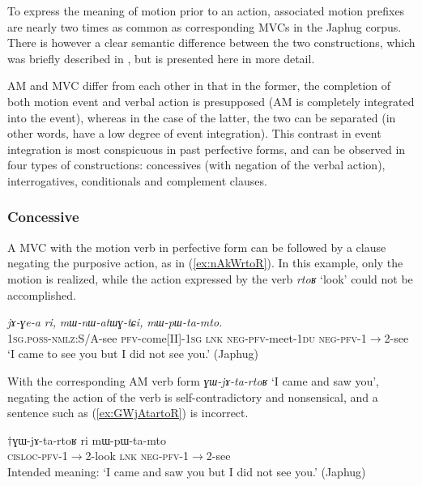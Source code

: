 \documentclass[oneside,a4paper,11pt]{article}
\newcommand{\ipa}[1]{{\phon\textit{#1}}}
\newcommand{\japhug}[2]{\textit{\phon#1} `#2'}
\newcommand{\fl}{$\rightarrow$}
\begin{document}
To express the meaning of motion prior to an action, associated motion prefixes are nearly two times as common as corresponding MVCs in the Japhug corpus. There is however a clear semantic difference between the two constructions, which was briefly described in \citet{jacques13harmonization}, but is presented here in more detail.

AM and MVC differ from each other in that in the former, the completion of both motion event and verbal action is presupposed (AM is completely integrated into the event), whereas in the case of the latter, the two can be separated (in other words, have a low degree of event integration). This contrast in event integration is most conspicuous in past perfective forms, and can be observed in four types of constructions: concessives (with negation of the verbal action), interrogatives, conditionals and complement clauses.

\subsubsection{Concessive} \label{sec:am.concessive}
A MVC  with the motion verb in perfective form can be followed by a clause negating the purposive action, as in (\ref{ex:nAkWrtoR}). In this example, only the motion is realized, while the action expressed by the verb \japhug{rtoʁ}{look} could not be accomplished.

\begin{exe}
\ex \label{ex:nAkWrtoR}
\gll \ipa{nɤ-kɯ-rtoʁ}	\ipa{jɤ-ɣe-a}	\ipa{ri,}	\ipa{mɯ-nɯ-atɯɣ-tɕi,}	\ipa{mɯ-pɯ-ta-mto.} \\
\textsc{1sg.poss}-\textsc{nmlz}:S/A-see \textsc{pfv}-come[II]-\textsc{1sg} \textsc{lnk} \textsc{neg}-\textsc{pfv}-meet-\textsc{1du} \textsc{neg}-\textsc{pfv}-1\fl2-see \\
\glt `I came to see you but I did not see you.' (Japhug)
\end{exe}

With the corresponding AM verb form \japhug{ɣɯ-jɤ-ta-rtoʁ}{I came and saw you}, negating the action of the verb is self-contradictory and nonsensical, and a sentence such as (\ref{ex:GWjAtartoR}) is incorrect.

\begin{exe}
\ex \label{ex:GWjAtartoR}
\gll $\dagger$ɣɯ-jɤ-ta-rtoʁ ri mɯ-pɯ-ta-mto \\
\textsc{cisloc}-\textsc{pfv}-1\fl2-look \textsc{lnk} \textsc{neg}-\textsc{pfv}-1\fl2-see \\
\glt Intended meaning: `I came and saw you but I did not see you.'  (Japhug)
\end{exe}
\end{document}
